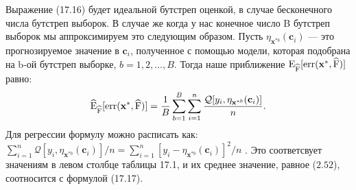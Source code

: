 Выражение (17.16) будет идеальной бутстреп оценкой, в случае бесконечного числа бутстреп выборок. В случае же когда у нас конечное число B бутстреп выборок мы аппроксимируем это следующим образом. Пусть $\eta_{\textbf{x}^{*b}}(\textbf{c}_{i})$ --- это прогнозируемое значение в $\textbf{c}_{i}$, полученное с помощью модели, которая подобрана на b-ой бутстреп выборке, $b = 1, 2,\ldots,B$. Тогда наше приближение
$\mathrm{E}_{\widehat{\text{F}}}[\text{err}(\textbf{x}^{*}, \widehat{\text{F}})]$ равно:
\begin{equation}
\widehat{\mathrm{E}}_{\widehat{\text{F}}}[\text{err}(\textbf{x}^{*}, \widehat{\text{F}})] = \frac{1}{B} \sum_{b = 1}^{B} \sum_{i = 1}^{n} \frac{  \mathcal{Q}[y_{i},  \eta_{\textbf{x}^{*b}}(\textbf{c}_{i})]}{n}.
\end{equation}
Для регрессии формулу можно расписать как: $ \sum_{i = 1}^{n}  \mathcal{Q}[y_{i},  \eta_{\textbf{x}^{*b}}(\textbf{c}_{i})] /n = \sum_{i = 1}^{n} [y_{i} - \eta_{\textbf{x}^{*b}}(\textbf{c}_{i})]^{2} / n $ . Это соответсвует значениям в левом столбце таблицы 17.1, и их среднее значение, равное ($2.52$), соотносится с формулой (17.17).


